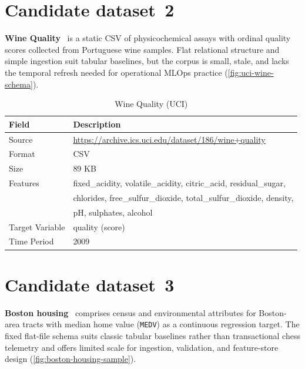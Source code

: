 \section[Dataset two]{Candidate dataset \textnumero\,2}
\label{sec:dataset-two}

\textbf{Wine Quality}~\cite{Cortez2009wine,UCIWineQuality} is a static CSV of physicochemical assays with ordinal quality scores collected from Portuguese wine samples.
Flat relational structure and simple ingestion suit tabular baselines, but the corpus is small, stale, and lacks the temporal refresh needed for operational MLOps practice (\cref{fig:uci-wine-schema}).

\begin{table}[h]
\centering
\caption{Wine Quality (UCI)}
\begin{tabular}{|p{}|p{}|}
\hline
\textbf{Field} & \textbf{Description} \\
\hline
Source & \url{https://archive.ics.uci.edu/dataset/186/wine+quality} \\
\hline
Format & CSV \\
\hline
Size & 89 KB \\
\hline
Features & fixed\_acidity, volatile\_acidity, citric\_acid, residual\_sugar, \\
          & chlorides, free\_sulfur\_dioxide, total\_sulfur\_dioxide, density, \\
          & pH, sulphates, alcohol \\
\hline
Target Variable & quality (score) \\
\hline
Time Period & 2009 \\
\hline
\end{tabular}
\end{table}



\section[Dataset three]{Candidate dataset \textnumero\,3}
\label{sec:dataset-three}

\textbf{Boston housing}~\cite{HarrisonRubinfeld1978,UCIBostonHousing} comprises census and environmental attributes for Boston-area tracts with median home value (\texttt{MEDV}) as a continuous regression target.
The fixed flat-file schema suits classic tabular baselines rather than transactional chess telemetry and offers limited scale for ingestion, validation, and feature-store design (\cref{fig:boston-housing-sample}).

